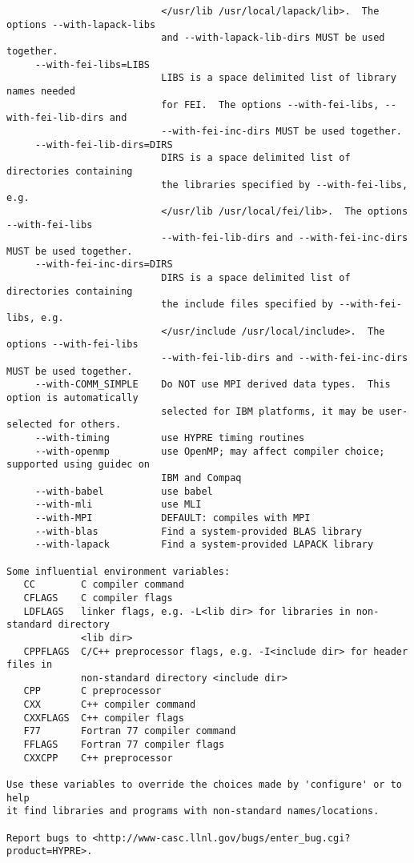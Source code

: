 \begin{verbatim}
                           </usr/lib /usr/local/lapack/lib>.  The options --with-lapack-libs
                           and --with-lapack-lib-dirs MUST be used together.
     --with-fei-libs=LIBS
                           LIBS is a space delimited list of library names needed 
                           for FEI.  The options --with-fei-libs, --with-fei-lib-dirs and 
                           --with-fei-inc-dirs MUST be used together.
     --with-fei-lib-dirs=DIRS
                           DIRS is a space delimited list of directories containing 
                           the libraries specified by --with-fei-libs, e.g.
                           </usr/lib /usr/local/fei/lib>.  The options --with-fei-libs
                           --with-fei-lib-dirs and --with-fei-inc-dirs MUST be used together.
     --with-fei-inc-dirs=DIRS
                           DIRS is a space delimited list of directories containing 
                           the include files specified by --with-fei-libs, e.g.
                           </usr/include /usr/local/include>.  The options --with-fei-libs
                           --with-fei-lib-dirs and --with-fei-inc-dirs MUST be used together.
     --with-COMM_SIMPLE    Do NOT use MPI derived data types.  This option is automatically
                           selected for IBM platforms, it may be user-selected for others.
     --with-timing         use HYPRE timing routines
     --with-openmp         use OpenMP; may affect compiler choice; supported using guidec on
                           IBM and Compaq
     --with-babel          use babel
     --with-mli            use MLI
     --with-MPI            DEFAULT: compiles with MPI
     --with-blas           Find a system-provided BLAS library
     --with-lapack         Find a system-provided LAPACK library

Some influential environment variables:
   CC        C compiler command
   CFLAGS    C compiler flags
   LDFLAGS   linker flags, e.g. -L<lib dir> for libraries in non-standard directory 
             <lib dir>
   CPPFLAGS  C/C++ preprocessor flags, e.g. -I<include dir> for header files in
             non-standard directory <include dir>
   CPP       C preprocessor
   CXX       C++ compiler command
   CXXFLAGS  C++ compiler flags
   F77       Fortran 77 compiler command
   FFLAGS    Fortran 77 compiler flags
   CXXCPP    C++ preprocessor

Use these variables to override the choices made by 'configure' or to help
it find libraries and programs with non-standard names/locations.

Report bugs to <http://www-casc.llnl.gov/bugs/enter_bug.cgi?product=HYPRE>.
\end{verbatim}

